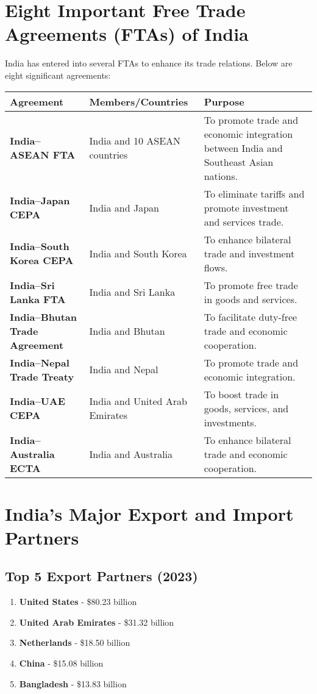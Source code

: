 \documentclass[12pt]{article}
\begin{document}
	\section{Eight Important Free Trade Agreements (FTAs) of India}
	
	India has entered into several FTAs to enhance its trade relations. Below are eight significant agreements:
	
	\begin{longtable}{@{}p{4cm}p{4cm}p{6cm}@{}}
		\toprule
		\textbf{Agreement} & \textbf{Members/Countries} & \textbf{Purpose} \\
		\midrule
		\endhead
		\textbf{India–ASEAN FTA} & India and 10 ASEAN countries & To promote trade and economic integration between India and Southeast Asian nations. \\
		\textbf{India–Japan CEPA} & India and Japan & To eliminate tariffs and promote investment and services trade. \\
		\textbf{India–South Korea CEPA} & India and South Korea & To enhance bilateral trade and investment flows. \\
		\textbf{India–Sri Lanka FTA} & India and Sri Lanka & To promote free trade in goods and services. \\
		\textbf{India–Bhutan Trade Agreement} & India and Bhutan & To facilitate duty-free trade and economic cooperation. \\
		\textbf{India–Nepal Trade Treaty} & India and Nepal & To promote trade and economic integration. \\
		\textbf{India–UAE CEPA} & India and United Arab Emirates & To boost trade in goods, services, and investments. \\
		\textbf{India–Australia ECTA} & India and Australia & To enhance bilateral trade and economic cooperation. \\
		\bottomrule
	\end{longtable}
	
	\section{India's Major Export and Import Partners}
	
	\subsection{Top 5 Export Partners (2023)}
	
	\begin{enumerate}[label=\arabic*.]
		\item \textbf{United States} - \$80.23 billion
		\item \textbf{United Arab Emirates} - \$31.32 billion
		\item \textbf{Netherlands} - \$18.50 billion
		\item \textbf{China} - \$15.08 billion
		\item \textbf{Bangladesh} - \$13.83 billion
	\end{enumerate}
	
\end{document}
